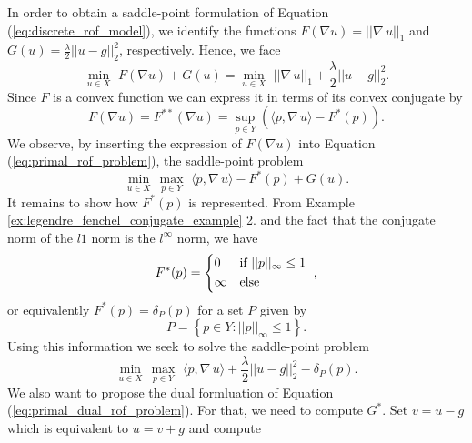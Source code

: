 \documentclass[abstracton]{scrreprt}
\begin{document}
            In order to obtain a saddle-point formulation of Equation (\ref{eq:discrete_rof_model}), we identify the functions $F(\nabla u) = ||\nabla \, u||_{1}$ and $G(u) = \frac{\lambda}{2} ||u - g||_{2}^{2}$, respectively. Hence, we face
                \begin{equation}
                    \min_{u \in X}\,\, F(\nabla u) + G(u) = \min_{u \in X}\,\, ||\nabla \, u||_{1} + \frac{\lambda}{2} ||u - g||_{2}^{2}.
                \label{eq:primal_rof_problem}
                \end{equation}
            Since $F$ is a convex function we can express it in terms of its convex conjugate by
                $$
                    F(\nabla u) = F^{\ast\ast}(\nabla u) = \sup\limits_{p \in Y} \left(\langle p, \nabla \, u \rangle - F^{\ast}(p) \right).
                $$
            We observe, by inserting the expression of $F(\nabla u)$ into Equation (\ref{eq:primal_rof_problem}), the saddle-point problem
                $$
                    \min_{u \in X}\, \max_{p \in Y}\,\, \langle p, \nabla \, u \rangle - F^{\ast}(p) + G(u).
                $$
            It remains to show how $F^{\ast}(p)$ is represented. From Example \ref{ex:legendre_fenchel_conjugate_example} 2. and the fact that the conjugate norm of the $l1$ norm is the $l^{\infty}$ norm, we have
                $$
                    F^{\ast}(p) =
                        \begin{dcases*}
                            0 & \textnormal{if $||p||_{\infty} \le 1$} \\
                            \infty & \textnormal{else}
                        \end{dcases*},
                $$
            or equivalently $F^{\ast}(p) = \delta_{P}(p)$ for a set $P$ given by
                \begin{equation}
                    P = \left\{ p \in Y : ||p||_{\infty} \le 1 \right\}.
                    \label{eq:the_set_P}
                \end{equation}
            Using this information we seek to solve the saddle-point problem
                \begin{equation}
                    \min_{u \in X}\, \max_{p \in Y}\,\, \langle p, \nabla\, u \rangle + \frac{\lambda}{2} ||u - g||_{2}^{2} - \delta_{P}(p).
                \label{eq:primal_dual_rof_problem}
                \end{equation}
            We also want to propose the dual formluation of Equation (\ref{eq:primal_dual_rof_problem}). For that, we need to compute $G^{\ast}$. Set $v = u - g$ which is equivalent to $u = v + g$ and compute
\end{document}
